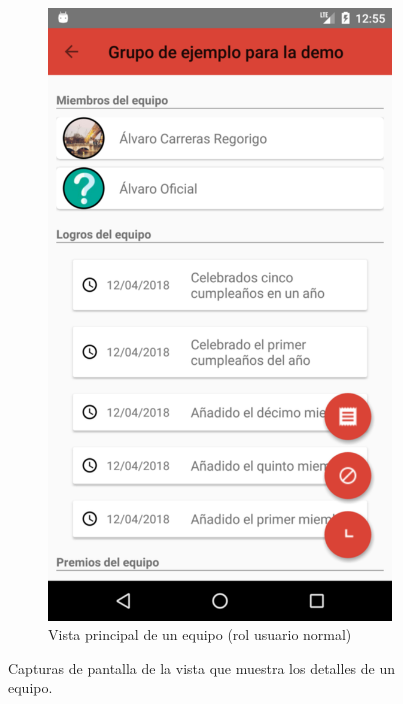 \documentclass[twoside]{report}
\begin{document}
\begin{figure}[H]
\begin{center}
\begin{subfigure}[t]{.3\linewidth}
		\includegraphics[scale=0.25]{images/userguide/16.png}
		\caption{Vista principal de un equipo (rol usuario normal)}
	\end{subfigure}\hspace{2mm}%
\caption{Capturas de pantalla de la vista que muestra los detalles de un equipo.}
\end{center}
\end{figure}
\end{document}
